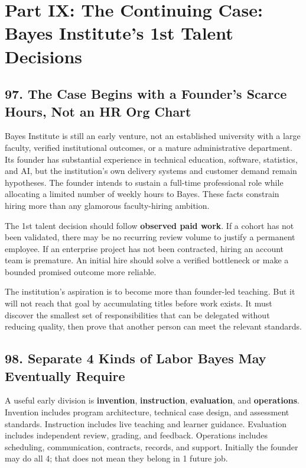 \section*{Part IX: The Continuing Case: Bayes Institute's 1st Talent Decisions}

\subsection*{97. The Case Begins with a Founder's Scarce Hours, Not an HR Org Chart}

Bayes Institute is still an early venture, not an established university with a large faculty, verified institutional outcomes, or a mature administrative department. Its founder has substantial experience in technical education, software, statistics, and AI, but the institution's own delivery systems and customer demand remain hypotheses. The founder intends to sustain a full-time professional role while allocating a limited number of weekly hours to Bayes. These facts constrain hiring more than any glamorous faculty-hiring ambition.

The 1st talent decision should follow \textbf{observed paid work}. If a cohort has not been validated, there may be no recurring review volume to justify a permanent employee. If an enterprise project has not been contracted, hiring an account team is premature. An initial hire should solve a verified bottleneck or make a bounded promised outcome more reliable.

The institution's aspiration is to become more than founder-led teaching. But it will not reach that goal by accumulating titles before work exists. It must discover the smallest set of responsibilities that can be delegated without reducing quality, then prove that another person can meet the relevant standards.

\subsection*{98. Separate 4 Kinds of Labor Bayes May Eventually Require}

A useful early division is \textbf{invention}, \textbf{instruction}, \textbf{evaluation}, and \textbf{operations}. Invention includes program architecture, technical case design, and assessment standards. Instruction includes live teaching and learner guidance. Evaluation includes independent review, grading, and feedback. Operations includes scheduling, communication, contracts, records, and support. Initially the founder may do all 4; that does not mean they belong in 1 future job.

